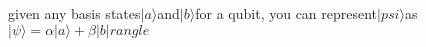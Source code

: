 \documentclass[preview]{standalone}
\begin{document}
\begin{center}
given any basis states$|a\rangle$and$|b\rangle$for a qubit, you can represent$|psi\rangle$as$|\psi\rangle=\alpha|a\rangle+\beta|b|rangle$
\end{center}
\end{document}
